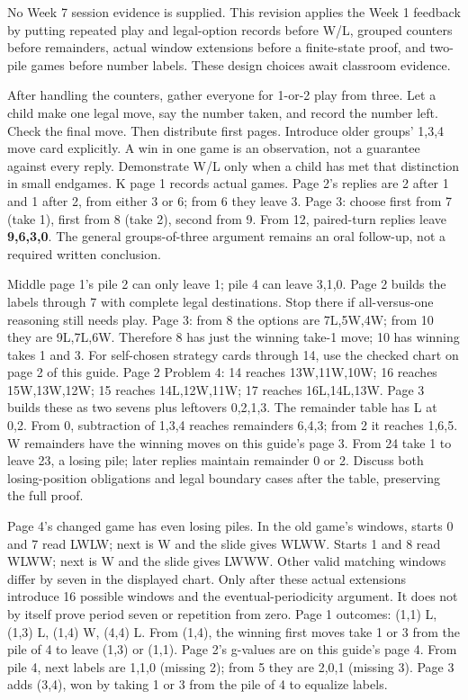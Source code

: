 \documentclass[11pt]{article}
\begin{document}
\newpage
{}
No Week 7 session evidence is supplied. This revision applies the Week 1 feedback by putting repeated play and legal-option records before W/L, grouped counters before remainders, actual window extensions before a finite-state proof, and two-pile games before number labels. These design choices await classroom evidence.

After handling the counters, gather everyone for 1-or-2 play from three. Let a child make one legal move, say the number taken, and record the number left. Check the final move. Then distribute first pages. Introduce older groups' 1,3,4 move card explicitly. A win in one game is an observation, not a guarantee against every reply. Demonstrate W/L only when a child has met that distinction in small endgames.
K page 1 records actual games. Page 2's replies are 2 after 1 and 1 after 2, from either 3 or 6; from 6 they leave 3. Page 3: choose first from 7 (take 1), first from 8 (take 2), second from 9. From 12, paired-turn replies leave \textbf{9,6,3,0}. The general groups-of-three argument remains an oral follow-up, not a required written conclusion.

Middle page 1's pile 2 can only leave 1; pile 4 can leave 3,1,0. Page 2 builds the labels through 7 with complete legal destinations. Stop there if all-versus-one reasoning still needs play. Page 3: from 8 the options are 7L,5W,4W; from 10 they are 9L,7L,6W. Therefore 8 has just the winning take-1 move; 10 has winning takes 1 and 3. For self-chosen strategy cards through 14, use the checked chart on page 2 of this guide.
Page 2 Problem 4: 14 reaches 13W,11W,10W; 16 reaches 15W,13W,12W; 15 reaches 14L,12W,11W; 17 reaches 16L,14L,13W. Page 3 builds these as two sevens plus leftovers 0,2,1,3. The remainder table has L at 0,2. From 0, subtraction of 1,3,4 reaches remainders 6,4,3; from 2 it reaches 1,6,5. W remainders have the winning moves on this guide's page 3. From 24 take 1 to leave 23, a losing pile; later replies maintain remainder 0 or 2. Discuss both losing-position obligations and legal boundary cases after the table, preserving the full proof.

Page 4's changed game has even losing piles. In the old game's windows, starts 0 and 7 read LWLW; next is W and the slide gives WLWW. Starts 1 and 8 read WLWW; next is W and the slide gives LWWW. Other valid matching windows differ by seven in the displayed chart. Only after these actual extensions introduce 16 possible windows and the eventual-periodicity argument. It does not by itself prove period seven or repetition from zero.
Page 1 outcomes: (1,1) L, (1,3) L, (1,4) W, (4,4) L. From (1,4), the winning first moves take 1 or 3 from the pile of 4 to leave (1,3) or (1,1). Page 2's g-values are on this guide's page 4. From pile 4, next labels are 1,1,0 (missing 2); from 5 they are 2,0,1 (missing 3). Page 3 adds (3,4), won by taking 1 or 3 from the pile of 4 to equalize labels.
\end{document}

